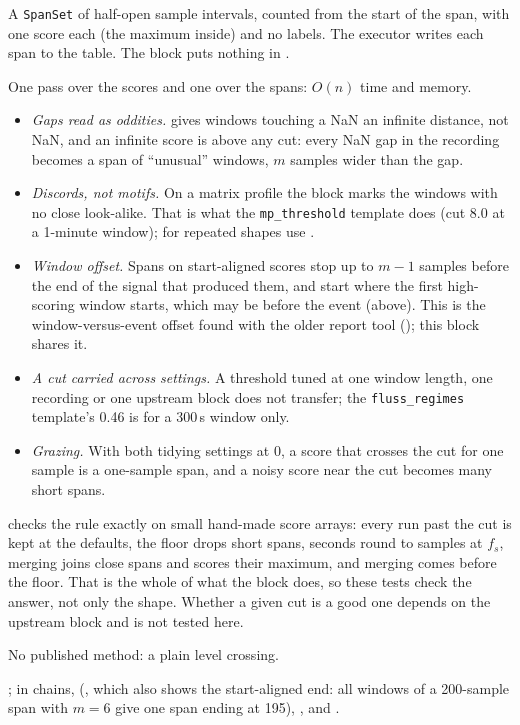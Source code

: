 A \texttt{SpanSet} of half-open sample intervals, counted from the start of the span, with one
score each (the maximum inside) and no labels. The executor writes each span to the
 table. The block puts nothing in .

One pass over the scores and one over the spans: $O(n)$ time and memory.

\begin{itemize}
\item \emph{Gaps read as oddities.}  gives windows touching a
  NaN an infinite distance, not NaN, and an infinite score is above any cut: every NaN gap in the
  recording becomes a span of ``unusual'' windows, $m$ samples wider than the gap.
\item \emph{Discords, not motifs.} On a matrix profile the block marks the windows with no close
  look-alike. That is what the \texttt{mp\_threshold} template does (cut 8.0 at a 1-minute window);
  for repeated shapes use .
\item \emph{Window offset.} Spans on start-aligned scores stop up to $m-1$ samples before the end
  of the signal that produced them, and start where the first high-scoring window starts, which
  may be before the event (above). This is the window-versus-event offset found with the older
  report tool (); this block shares it.
\item \emph{A cut carried across settings.} A threshold tuned at one window length, one recording
  or one upstream block does not transfer; the \texttt{fluss\_regimes} template's 0.46 is for a
  300\,s window only.
\item \emph{Grazing.} With both tidying settings at 0, a score that crosses the cut for one sample
  is a one-sample span, and a noisy score near the cut becomes many short spans.
\end{itemize}

 checks the rule exactly on small hand-made score arrays:
every run past the cut is kept at the defaults, the floor drops short spans, seconds round to
samples at $f_s$, merging joins close spans and scores their maximum, and merging comes before the
floor. That is the whole of what the block does, so these tests check the answer, not only the
shape. Whether a given cut is a good one depends on the upstream block and is not tested here.

No published method: a plain level crossing.

; in chains, 
(, which also shows the
start-aligned end: all windows of a 200-sample span with $m = 6$ give one span ending at 195),
,  and
.
